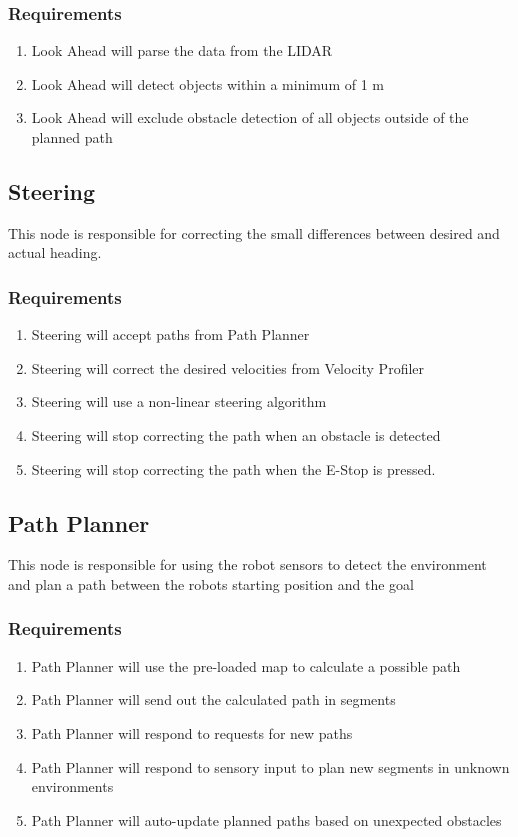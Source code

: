   \subsubsection{Requirements}
  \begin{enumerate}
  \item Look Ahead will parse the data from the LIDAR
  \item Look Ahead will detect objects within a minimum of 1 m
    \item Look Ahead will exclude obstacle detection of all objects
      outside of the planned path
      \end{enumerate}

  \subsection{Steering}
  This node is responsible for correcting the small differences
  between desired and actual heading.
  
  \subsubsection{Requirements}

  \begin{enumerate}
  \item Steering will accept paths from Path Planner
    \item Steering will correct the desired velocities from Velocity
      Profiler
    \item Steering will use a non-linear steering algorithm
      \item Steering will stop correcting the path when an obstacle is
detected
\item Steering will stop correcting the path when the E-Stop is pressed.
    \end{enumerate}

  \subsection{Path Planner}
  This node is responsible for using the robot sensors to detect the
  environment and plan a path between the robots starting position and
  the goal

  \subsubsection{Requirements}

  \begin{enumerate}
\item Path Planner will use the pre-loaded map to calculate a possible
  path
\item Path Planner will send out the calculated path in segments
\item Path Planner will respond to requests for new paths
  \item Path Planner will respond to sensory input to plan new
    segments in unknown environments
    \item Path Planner will auto-update planned paths based on
      unexpected obstacles
    \end{enumerate}
  
